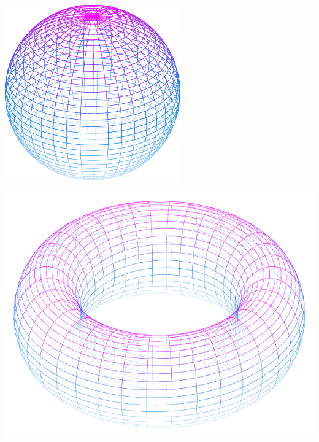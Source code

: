 \documentclass[11pt,openany]{article}
\begin{document}
\begin{center}
\begin{minipage}{.45\textwidth}\centering
\includegraphics[scale=1.2]{../tikz/grad-math-tikz-pdf/sphere.pdf}
\end{minipage}
\begin{minipage}{.45\textwidth}\centering
\includegraphics[scale=.7]{../tikz/grad-math-tikz-pdf/torus.pdf}
\end{minipage}
\end{center}



\vfill
\end{document}
